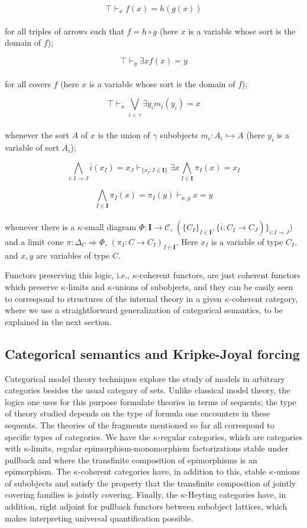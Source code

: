 \documentclass[a4paper,11pt]{article}
\theoremstyle{plain}
\theoremstyle{plain}
\theoremstyle{remark}
\begin{document}
$$\top \vdash_x f(x)=h(g(x))$$
\\
for all triples of arrows such that $f=h \circ g$ (here $x$ is a variable whose sort is the domain of $f$);

$$\top \vdash_y \exists x f(x)=y$$
\\
for all covers $f$ (here $x$ is a variable whose sort is the domain of $f$);

$$\top \vdash_x \bigvee_{i<\gamma}\exists y_i m_i(y_i)=x$$
\\
whenever the sort $A$ of $x$ is the union of $\gamma$ subobjects $m_i: A_i \rightarrowtail A$ (here $y_i$ is a variable of sort $A_i$);

$$\bigwedge_{i:I \to J}\overline{i}(x_I)=x_J \vdash_{\{x_I: I \in \mathbf{I}\}} \exists x \bigwedge_{I \in \mathbf{I}} \pi_I(x)=x_I$$

$$\bigwedge_{I \in \mathbf{I}}\pi_I(x)=\pi_I(y) \vdash_{x, y} x=y$$
\\
whenever there is a $\kappa$-small diagram $\Phi: \mathbf{I} \to \mathcal{C}$, $(\{C_I\}_{I \in \mathbf{I}}, \{\overline{i}: C_I \to C_J)\}_{i: I \to J})$ and a limit cone $\pi: \Delta_C \Rightarrow \Phi$, $(\pi_I: C \to C_I)_{I \in \mathbf{I}}$. Here $x_I$ is a variable of type $C_I$, and $x, y$ are variables of type $C$.

Functors preserving this logic, i.e., $\kappa$-coherent functors, are just coherent functors which preserve $\kappa$-limits and $\kappa$-unions of subobjects, and they can be easily seen to correspond to structures of the internal theory in a given $\kappa$-coherent category, where we use a straightforward generalization of categorical semantics, to be explained in the next section.

\subsection{Categorical semantics and Kripke-Joyal forcing}

Categorical model theory techniques explore the study of models in arbitrary categories besides the usual category of sets. Unlike classical model theory, the logics one uses for this purpose formulate theories in terms of sequents; the type of theory studied depends on the type of formula one encounters in these sequents. The theories of the fragments mentioned so far all correspond to specific types of categories. We have the $\kappa$-regular categories, which are categories with $\kappa$-limits, regular epimorphism-monomorphism factorizations stable under pullback and where the transfinite composition of epimorphisms is an epimorphism. The $\kappa$-coherent categories have, in addition to this, stable $\kappa$-unions of subobjects and satisfy the property that the transfinite composition of jointly covering families is jointly covering. Finally, the $\kappa$-Heyting categories have, in addition, right adjoint for pullback functors between subobject lattices, which makes interpreting universal quantification possible.
\end{document}
